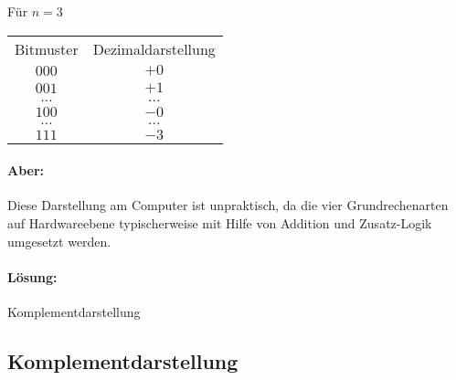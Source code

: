 \begin{example}
Für $n=3$\\

\begin{table}[htpb]
	\centering
	\begin{tabular}{c c}
		Bitmuster & Dezimaldarstellung \\
		$000$ & $+0$ \\
		$001$ & $+1$ \\
		$\ldots$ & $\ldots$ \\
		$100$ & $-0$ \\
		$\ldots$ & $\ldots$ \\
		$111$ & $-3$
	\end{tabular}
\end{table}
\end{example}

\paragraph{Aber:} Diese Darstellung am Computer ist unpraktisch, da die vier Grundrechenarten auf Hardwareebene typischerweise mit Hilfe von Addition und Zusatz-Logik umgesetzt werden.
\paragraph{Lösung:} Komplementdarstellung

\subsection{Komplementdarstellung}

